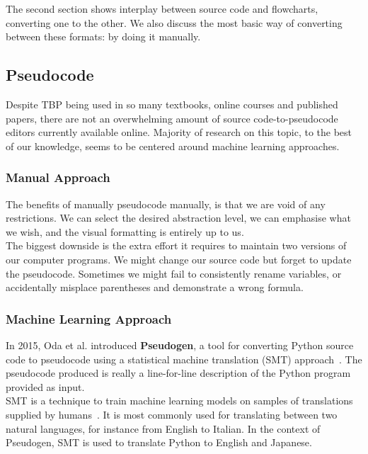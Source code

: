 The second section shows interplay between source code and flowcharts, converting one to the other. We also discuss the most basic way of converting between these formats: by doing it manually.

\subsection{Pseudocode}

Despite TBP being used in so many textbooks, online courses and published papers, there are not an overwhelming amount of source code-to-pseudocode editors currently available online. Majority of research on this topic, to the best of our knowledge, seems to be centered around machine learning approaches.

\subsubsection{Manual Approach}

The benefits of manually pseudocode manually, is that we are void of any restrictions. We can select the desired abstraction level, we can emphasise what we wish, and the visual formatting is entirely up to us. \\

The biggest downside is the extra effort it requires to maintain two versions of our computer programs. We might change our source code but forget to update the pseudocode. Sometimes we might fail to consistently rename variables, or accidentally misplace parentheses and demonstrate a wrong formula.

\subsubsection{Machine Learning Approach}

In 2015, Oda et al. introduced \textbf{Pseudogen}, a tool for converting Python source code to pseudocode using a statistical machine translation (SMT) approach~\cite{pseudogen}. The pseudocode produced is really a line-for-line description of the Python program provided as input. \\

SMT is a technique to train machine learning models on samples of translations supplied by humans~\cite{whatIsSMT}. It is most commonly used for translating between two natural languages, for instance from English to Italian. In the context of Pseudogen, SMT is used to translate Python to English and Japanese. \\

